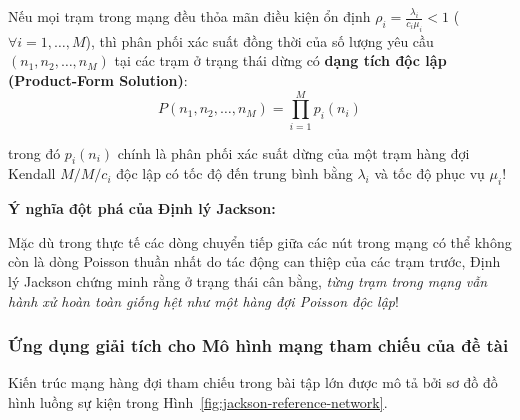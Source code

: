 \begin{theorempop}[title=\textbf{Định lý Jackson (Jackson's Theorem, 1957)}]
Nếu mọi trạm trong mạng đều thỏa mãn điều kiện ổn định $\rho_i = \frac{\lambda_i}{c_i \mu_i} < 1$ ($\forall i = 1, \dots, M$), thì phân phối xác suất đồng thời của số lượng yêu cầu $(n_1, n_2, \dots, n_M)$ tại các trạm ở trạng thái dừng có \textbf{dạng tích độc lập (Product-Form Solution)}:
\begin{equation}
    P(n_1, n_2, \dots, n_M) = \prod_{i=1}^M p_i(n_i)
\end{equation}

trong đó $p_i(n_i)$ chính là phân phối xác suất dừng của một trạm hàng đợi Kendall $M/M/c_i$ độc lập có tốc độ đến trung bình bằng $\lambda_i$ và tốc độ phục vụ $\mu_i$!
\end{theorempop}

\textbf{Ý nghĩa đột phá của Định lý Jackson:} 

Mặc dù trong thực tế các dòng chuyển tiếp giữa các nút trong mạng có thể không còn là dòng Poisson thuần nhất do tác động can thiệp của các trạm trước, Định lý Jackson chứng minh rằng ở trạng thái cân bằng, \textit{từng trạm trong mạng vẫn hành xử hoàn toàn giống hệt như một hàng đợi Poisson độc lập}!

\subsubsection{Ứng dụng giải tích cho Mô hình mạng tham chiếu của đề tài}

Kiến trúc mạng hàng đợi tham chiếu trong bài tập lớn được mô tả bởi sơ đồ đồ hình luồng sự kiện trong Hình~\ref{fig:jackson-reference-network}.

